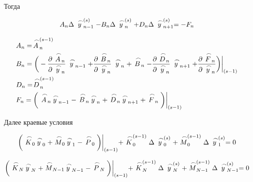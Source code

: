 \documentclass[a4paper,14pt]{extreport} %
\begin{document}
\begin{enumerate}
Тогда

\begin{equation*}
A_n\Delta\buildrel\,\,\frown\over{y}_{n-1}^{(s)}-B_n\Delta\buildrel\,\,\frown\over{y}_{n}^{(s)}+D_n\Delta\buildrel\,\,\frown\over{y}_{n+1}^{(s)}=-F_n
\end{equation*}

\begin{equation*}
\begin{aligned}
&A_n=\buildrel\,\,\frown\over{A}_n^{(s-1)}\\
&B_n=\bigg(-\frac{\partial \buildrel\,\,\frown\over{A}_n}{\partial\buildrel\,\,\frown\over{y}_n}\buildrel\,\,\frown\over{y}_{n-1}+\frac{\partial \buildrel\,\,\frown\over{B}_n}{\partial\buildrel\,\,\frown\over{y}_n}\buildrel\,\,\frown\over{y}_{n}+\buildrel\,\,\frown\over{B}_n-\frac{\partial \buildrel\,\,\frown\over{D}_n}{\partial\buildrel\,\,\frown\over{y}_n}\buildrel\,\,\frown\over{y}_{n+1}+\frac{\partial \buildrel\,\,\frown\over{F}_n}{\partial\buildrel\,\,\frown\over{y}_n}\bigg)\bigg|_{(s-1)}\\
&D_n=\buildrel\,\,\frown\over{D}_n^{(s-1)}\\
&F_n=\bigg(\buildrel\,\,\frown\over{A}_n\buildrel\,\,\frown\over{y}_{n-1}-\buildrel\,\,\frown\over{B}_n\buildrel\,\,\frown\over{y}_n+\buildrel\,\,\frown\over{D}_n\buildrel\,\,\frown\over{y}_{n+1}+\buildrel\,\,\frown\over{F}_n\bigg)\bigg|_{(s-1)}
\end{aligned}
\end{equation*}

Далее краевые условия

\begin{multline*}
\bigg( \buildrel\,\,\frown\over{K}_0 \buildrel\,\,\frown\over{y}_0+ \buildrel\,\,\frown\over{M}_0 \buildrel\,\,\frown\over{y}_1- \buildrel\,\,\frown\over{P}_0\bigg)\bigg|_{(s-1)}+\buildrel\,\,\frown\over{K}_0^{(s-1)}\Delta\buildrel\,\,\frown\over{y}_{0}^{(s)}+\buildrel\,\,\frown\over{M}_0^{(s-1)}\Delta\buildrel\,\,\frown\over{y}_{1}^{(s)}=0
\end{multline*}

\begin{multline*}
\bigg( \buildrel\,\,\frown\over{K}_N \buildrel\,\,\frown\over{y}_N+ \buildrel\,\,\frown\over{M}_{N-1} \buildrel\,\,\frown\over{y}_{N-1}- \buildrel\,\,\frown\over{P}_N\bigg)\bigg|_{(s-1)}+\buildrel\,\,\frown\over{K}_N^{(s-1)}\Delta\buildrel\,\,\frown\over{y}_{N}^{(s)}+\buildrel\,\,\frown\over{M}_{N-1}^{(s-1)}\Delta\buildrel\,\,\frown\over{y}_{N-1}^{(s)}=0
\end{multline*}


\end{enumerate}
\end{document}
